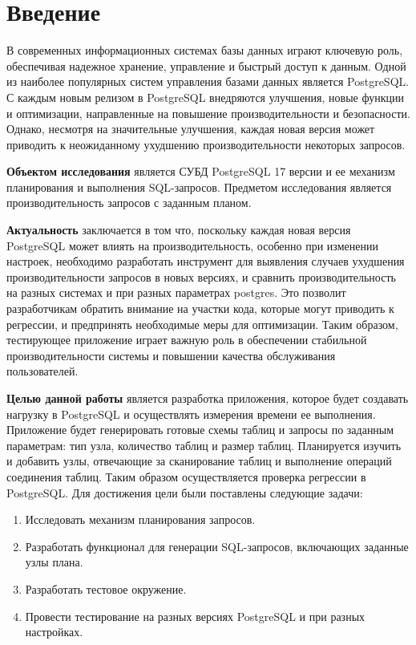 \chapter*{Введение}

В современных информационных системах базы данных играют ключевую роль, обеспечивая надежное хранение, управление и быстрый доступ к данным. Одной из наиболее популярных систем управления базами данных является PostgreSQL. С каждым новым релизом в PostgreSQL внедряются улучшения, новые функции и оптимизации, направленные на повышение производительности и безопасности. Однако, несмотря на значительные улучшения, каждая новая версия может приводить к неожиданному ухудшению производительности некоторых запросов. 

\textbf{Объектом исследования} является СУБД PostgreSQL 17 версии и ее механизм планирования и выполнения SQL-запросов.
Предметом исследования является производительность запросов с  заданным планом.

\textbf{Актуальность} заключается в том что, поскольку каждая новая версия PostgreSQL может влиять на производительность, особенно при изменении настроек, необходимо разработать инструмент для выявления случаев ухудшения производительности запросов в новых версиях, и сравнить производительность на разных системах и при разных параметрах postgres. Это позволит разработчикам обратить внимание на участки кода, которые могут приводить к регрессии, и предпринять необходимые меры для оптимизации. Таким образом, тестирующее приложение играет важную роль в обеспечении стабильной производительности системы и повышении качества обслуживания пользователей.

\textbf{Целью данной работы} является разработка приложения, которое будет создавать нагрузку в PostgreSQL и осуществлять измерения времени ее выполнения. Приложение будет генерировать готовые схемы таблиц и запросы по заданным параметрам: тип узла, количество таблиц и размер таблиц. Планируется изучить и добавить узлы, отвечающие за сканирование таблиц и выполнение операций соединения таблиц. Таким образом осуществляется проверка регрессии в PostgreSQL. Для достижения цели были поставлены следующие задачи: 
\begin{enumerate}
    \item Исследовать механизм планирования запросов.
    \item Разработать функционал для генерации SQL-запросов, включающих заданные узлы плана.
    \item Разработать тестовое окружение.
    \item Провести тестирование на разных версиях PostgreSQL и при разных настройках.
\end{enumerate}

